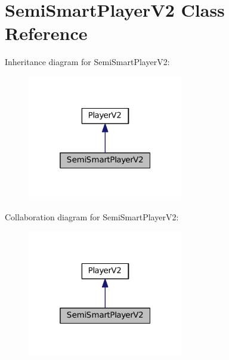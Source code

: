 \hypertarget{classSemiSmartPlayerV2}{}\section{Semi\+Smart\+Player\+V2 Class Reference}
\label{classSemiSmartPlayerV2}


Inheritance diagram for Semi\+Smart\+Player\+V2\+:\nopagebreak
\begin{figure}[H]
\begin{center}
\leavevmode
\includegraphics[width=193pt]{classSemiSmartPlayerV2__inherit__graph}
\end{center}
\end{figure}


Collaboration diagram for Semi\+Smart\+Player\+V2\+:\nopagebreak
\begin{figure}[H]
\begin{center}
\leavevmode
\includegraphics[width=193pt]{classSemiSmartPlayerV2__coll__graph}
\end{center}
\end{figure}

